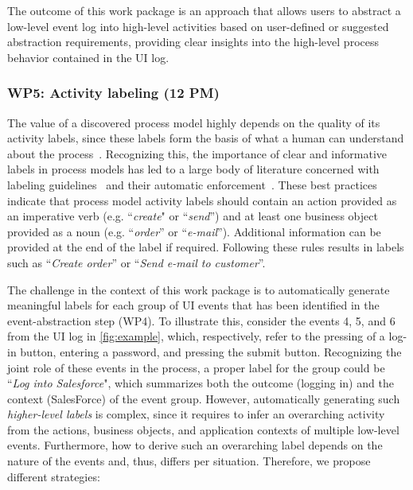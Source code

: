  The outcome of this work package is an approach that allows users to abstract a low-level event log into high-level activities based on user-defined or suggested abstraction requirements, providing clear insights into the high-level process behavior contained in the UI log.


\subsubsection{WP5: Activity labeling (12 PM)}
\label{sec:wp5}

The value of a discovered process model highly depends on the quality of its activity labels, since these labels form the basis of what a human can understand about the process~\cite{mendling2010activity,Leopold2013Book}. Recognizing this,  the importance of clear and informative labels in process models has led to a large body of literature concerned with labeling guidelines~\cite{mendling2010seven,leopold2015learning} and their automatic enforcement~\cite{leopold2013detection,becker2009towards}. 
These best practices indicate that process model activity labels should contain an action provided as an imperative verb (e.g. ``\textit{create}" or ``\textit{send}'') and at least one business object provided as a noun (e.g. ``\textit{order}'' or ``\textit{e-mail}''). Additional information can be provided at the end of the label if required. Following these rules results in labels such as ``\textit{Create order}'' or ``\textit{Send e-mail to customer}''. 

The challenge in the context of this work package is to automatically generate meaningful labels for each group of UI events that has been identified in the event-abstraction step (WP4). To illustrate this, consider the events 4, 5, and 6 from the UI log in \autoref{fig:example}, which, respectively, refer to the pressing of a log-in button, entering a password, and pressing the submit button.
Recognizing the joint role of these events in the process, a proper label for the group could be ``\textit{Log into Salesforce}", which summarizes both the outcome (logging in) and the context (SalesForce) of the event group. 
However, automatically generating such \textit{higher-level labels} is complex, since it requires to infer an overarching activity from the actions, business objects, and application contexts of multiple low-level events. Furthermore, how to derive such an overarching label depends on the nature of the events and, thus, differs per situation. Therefore, we propose different strategies:


